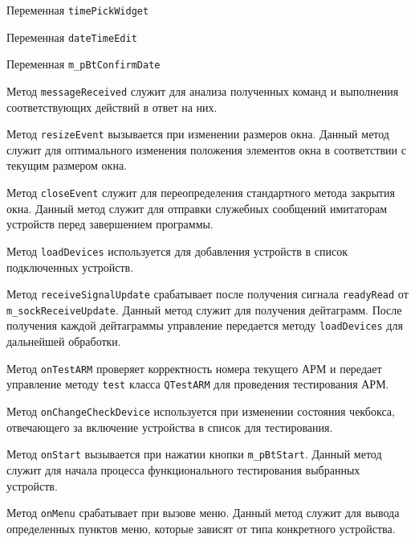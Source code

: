 \begin{enum}
	\item Переменная \texttt{timePickWidget}
	\item Переменная \texttt{dateTimeEdit}
	\item Переменная \texttt{m\_pBtConfirmDate}

	\item Метод \texttt{messageReceived} служит для анализа полученных команд и выполнения соответствующих действий
		в ответ на них.

	\item Метод \texttt{resizeEvent} вызывается при изменении размеров окна. Данный метод служит для оптимального
		изменения положения элементов окна в соответствии с текущим размером окна.

	\item Метод \texttt{closeEvent} служит для переопределения стандартного метода закрытия окна. Данный метод
		служит для отправки служебных сообщений имитаторам устройств перед завершением программы.

	\item Метод \texttt{loadDevices} используется для добавления устройств в список подключенных устройств.

	\item Метод \texttt{receiveSignalUpdate} срабатывает после получения сигнала \texttt{readyRead} от
		\texttt{m\_sockReceiveUpdate}. Данный метод служит для получения дейтаграмм. После получения каждой
		дейтаграммы управление передается методу \texttt{loadDevices} для дальнейшей обработки.

	\item Метод \texttt{onTestARM} проверяет корректность номера текущего АРМ и передает управление методу
		\texttt{test} класса \texttt{QTestARM} для проведения тестирования АРМ.

	\item Метод \texttt{onChangeCheckDevice} используется при изменении состояния чекбокса, отвечающего за включение
		устройства в список для тестирования.

	\item Метод \texttt{onStart} вызывается при нажатии кнопки \texttt{m\_pBtStart}. Данный метод служит для начала
		процесса функционального тестирования выбранных устройств.

	\item Метод \texttt{onMenu} срабатывает при вызове меню. Данный метод служит для вывода определенных пунктов
		меню, которые зависят от типа конкретного устройства.


\end{enum}
